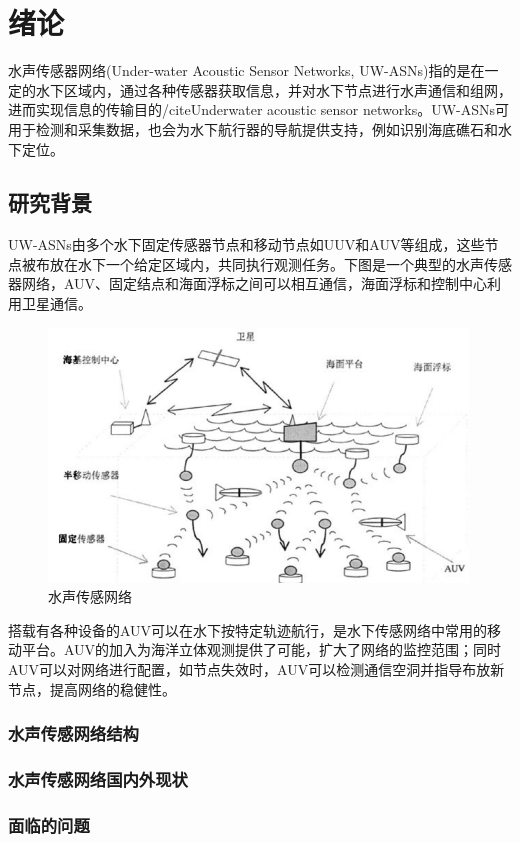 \chapter{绪论}
水声传感器网络(Under-water Acoustic Sensor Networks, UW-ASNs)指的是在一定的水下区域内，通过各种传感器获取信息，并对水下节点进行水声通信和组网，进而实现信息的传输目的/cite{Underwater acoustic sensor networks}。UW-ASNs可用于检测和采集数据，也会为水下航行器的导航提供支持，例如识别海底礁石和水下定位。


\section{研究背景}
UW-ASNs由多个水下固定传感器节点和移动节点如UUV和AUV等组成，这些节点被布放在水下一个给定区域内，共同执行观测任务。下图是一个典型的水声传感器网络，AUV、固定结点和海面浮标之间可以相互通信，海面浮标和控制中心利用卫星通信。
\begin{figure}[ht]
	\centering
	\includegraphics[scale=0.8]{figures/1.png}
	\caption{
		水声传感网络
	}
	\label{fig:example}
\end{figure}

搭载有各种设备的AUV可以在水下按特定轨迹航行，是水下传感网络中常用的移动平台。AUV的加入为海洋立体观测提供了可能，扩大了网络的监控范围；同时AUV可以对网络进行配置，如节点失效时，AUV可以检测通信空洞并指导布放新节点，提高网络的稳健性。

\subsection{水声传感网络结构}

\subsection{水声传感网络国内外现状}

\subsection{面临的问题}



